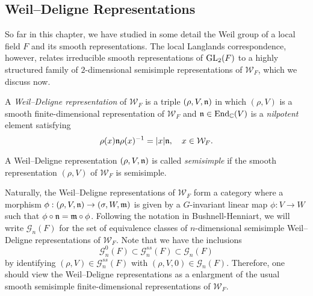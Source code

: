 \subsection{Weil--Deligne Representations}\label{sec:weildeligne}
So far in this chapter, we have studied in some detail the Weil group of a local field $F$ and its smooth representations. The local Langlands correspondence, however, relates irreducible smooth representations of $\mathrm{GL}_2(F)$ to a highly structured family of $2$-dimensional semisimple representations of $\mathcal{W}_F$, which we discuss now.

\begin{defn}\label{defn:WeilDeligne}
    A \textit{Weil--Deligne representation} of $\mathcal{W}_F$ is a triple $(\rho,V,\mathfrak{n})$ in which $(\rho,V)$ is a smooth finite-dimensional representation of $\mathcal{W}_F$ and $\mathfrak{n}\in\mathrm{End}_{\mathbb{C}}(V)$ is a \textit{nilpotent} element satisfying
    $$\rho(x)\mathfrak{n}\rho(x)^{-1}=|x|\mathfrak{n},\quad x\in \mathcal{W}_F.$$

    A Weil--Deligne representation $(\rho,V,\mathfrak{n})$ is called \textit{semisimple} if the smooth representation $(\rho,V)$ of $\mathcal{W}_F$ is semisimple.
\end{defn}

Naturally, the Weil--Deligne representations of $\mathcal{W}_F$ form a category where a morphism $\phi:(\rho,V,\mathfrak{n})\to(\sigma,W,\mathfrak{m})$ is given by a $G$-invariant linear map $\phi:V\to W$ such that $\phi\circ\mathfrak{n}=\mathfrak{m}\circ\phi$. Following the notation in Bushnell-Henniart, we will write $\mathcal{G}_n(F)$ for the set of equivalence classes of $n$-dimensional semisimple Weil--Deligne representations of $\mathcal{W}_F$. Note that we have the inclusions
$$\mathcal{G}^{0}_n(F)\subset\mathcal{G}_n^{ss}(F)\subset\mathcal{G}_n(F)$$
by identifying $(\rho,V)\in\mathcal{G}_n^{ss}(F)$ with $(\rho,V,0)\in\mathcal{G}_n(F)$. Therefore, one should view the Weil--Deligne representations as a enlargment of the usual smooth semisimple finite-dimensional representations of $\mathcal{W}_F$. 


